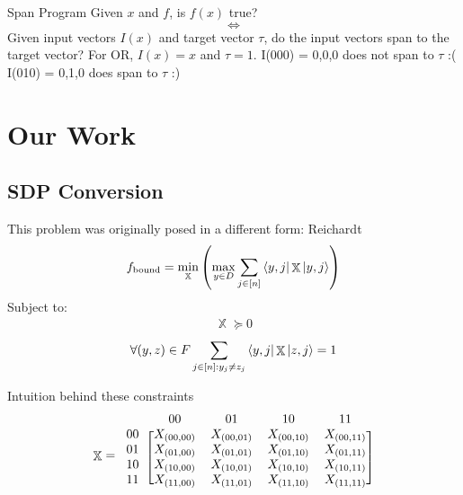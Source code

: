 \documentclass[12pt]{beamer}
\DeclareMathOperator{\X}{\mathbb{X}}		     %
\begin{document}
\begin{frame}{Span Program}
Given $x$ and $f$, is $f(x)$ true?
$$\iff$$
Given input vectors $I(x)$ and target vector $\tau$,
do the input vectors span to the target vector?
\newline
\newline
{}
{
For OR, $I(x) = x$ and $\tau = 1$.
}
\newline
\newline
{}
{
I(000) = {0,0,0} does not span to $\tau$
:(
}
{
I(010) = {0,1,0} does span to $\tau$
:)
}
\end{frame}

\section{Our Work}

\subsection{SDP Conversion}
\begin{frame}{This problem was originally posed in a different
form: Reichardt \cite{reichardt2009span}}
\begin{align} \label{eq:reichardtObj} 
    f_{\text{bound}} = \min_{\X} \left( \max_{y \in D} \sum_{j \in [n]}
    \bra{y,j}\X\ket{y,j}  \right) \nonumber
\end{align}
Subject to:
\begin{align}\label{Eq:reichardtSemi}
    \X \succcurlyeq 0 \nonumber
\end{align}
\begin{align}\label{Eq:reichardtOffDiag}
    \forall (y,z) \in F \sum_{j \in [n]: y_j \ne z_j} 
    \bra{y,j} \X \ket{z, j} = 1 \nonumber
\end{align}
\end{frame}

\begin{frame}{Intuition behind these constraints}
    \begin{align}
\X = \begin{blockarray}{ccccc}
\qquad & 00 & 01 & 10 & 11 \\
\begin{block}{c[cccc]}
  00 & X_{(00,00)} & X_{(00,01)} & X_{(00,10)} & X_{(00,11)}\\
  01 & X_{(01,00)} & X_{(01,01)} & X_{(01,10)} & X_{(01,11)}\\
  10 & X_{(10,00)} & X_{(10,01)} & X_{(10,10)} & X_{(10,11)}\\
  11 & X_{(11,00)} & X_{(11,01)} & X_{(11,10)} & X_{(11,11)}\\
\end{block}
\end{blockarray} \nonumber 
\end{align}
\end{frame}
\end{document}
